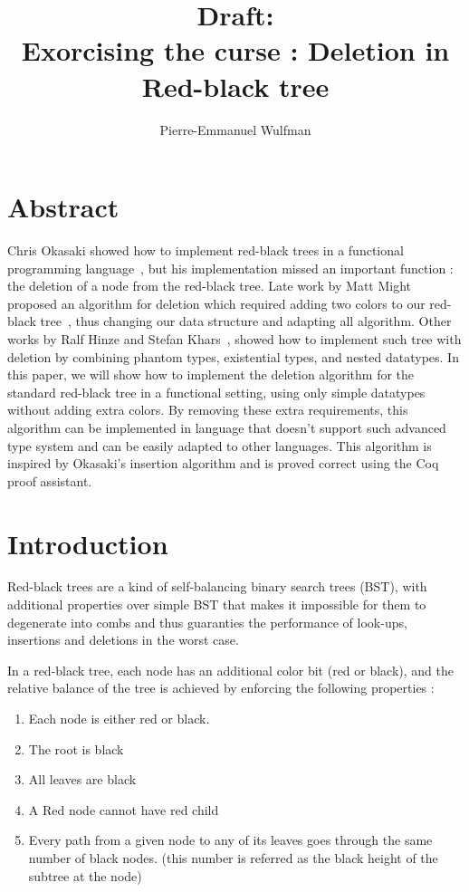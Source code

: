 \documentclass[10pt,a4paper]{article}
\title{Draft:\\ Exorcising the curse : Deletion in Red-black tree}
\author{Pierre-Emmanuel Wulfman}
\begin{document}
\maketitle

\section*{Abstract}

Chris Okasaki showed how to implement red-black trees in a functional programming language~\cite{okasaki_1999}, but his implementation missed an important function : the deletion of a node from the red-black tree.
Late work by Matt Might proposed an algorithm for deletion which required adding two colors to our red-black tree~\cite{germane_might_2014}, thus changing our data structure and adapting all algorithm.
Other works by Ralf Hinze and Stefan Khars~\cite{kahrs_2001}, showed how to implement such tree with deletion by combining phantom types, existential types, and nested datatypes.
In this paper, we will show how to implement the deletion algorithm for the standard red-black tree in a functional setting, using only simple datatypes without adding extra colors.
By removing these extra requirements, this algorithm can be implemented in language that doesn't support such advanced type system and can be easily adapted to other languages.
This algorithm is inspired by Okasaki's insertion algorithm and is proved correct using the Coq proof assistant.

\section{Introduction}

Red-black trees are a kind of self-balancing binary search trees (BST),
with additional properties over simple BST that makes it impossible for them to degenerate into combs
and thus guaranties the performance of look-ups, insertions and deletions in the worst case.


In a red-black tree, each node has an additional color bit (red or black), and the relative balance
of the tree is achieved by enforcing the following properties :
\begin{enumerate}
   \item Each node is either red or black.
   \item The root is black
   \item All leaves are black
   \item A Red node cannot have red child
   \item Every path from a given node to any of its leaves goes through the same number of black nodes. (this number is referred as the black height of the subtree at the node)
\end{enumerate}
\end{document}
